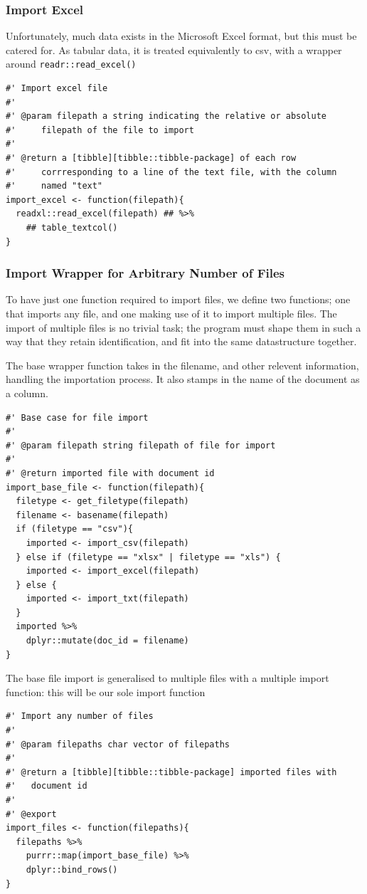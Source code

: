 \documentclass[11pt, a4paper, oneside]{report}
\begin{document}
\subsubsection{Import Excel}
\label{sec:org7535b78}
Unfortunately, much data exists in the Microsoft Excel format, but
this must be catered for. As tabular data, it is treated equivalently
to csv, with a wrapper around \texttt{readr::read_excel()}
\begin{verbatim}
#' Import excel file
#'
#' @param filepath a string indicating the relative or absolute
#'     filepath of the file to import
#'
#' @return a [tibble][tibble::tibble-package] of each row
#'     corrresponding to a line of the text file, with the column
#'     named "text"
import_excel <- function(filepath){
  readxl::read_excel(filepath) ## %>%
    ## table_textcol()
}
\end{verbatim}
\subsubsection{Import Wrapper for Arbitrary Number of Files}
\label{sec:orgf966fad}
To have just one function required to import files, we define two
functions; one that imports any file, and one making use of it to
import multiple files. The import of multiple files is no trivial
task; the program must shape them in such a way that they retain
identification, and fit into the same datastructure together.

The base wrapper function takes in the filename, and other relevent
information, handling the importation process. It also stamps in the
name of the document as a column.
\begin{verbatim}
#' Base case for file import
#'
#' @param filepath string filepath of file for import
#'
#' @return imported file with document id
import_base_file <- function(filepath){
  filetype <- get_filetype(filepath)
  filename <- basename(filepath)
  if (filetype == "csv"){
    imported <- import_csv(filepath)
  } else if (filetype == "xlsx" | filetype == "xls") {
    imported <- import_excel(filepath)
  } else {
    imported <- import_txt(filepath)
  }
  imported %>%
    dplyr::mutate(doc_id = filename)
}
\end{verbatim}
The base file import is generalised to multiple files with a multiple
import function: this will be our sole import function
\begin{verbatim}
#' Import any number of files
#'
#' @param filepaths char vector of filepaths
#'
#' @return a [tibble][tibble::tibble-package] imported files with
#'   document id
#' 
#' @export
import_files <- function(filepaths){
  filepaths %>%
    purrr::map(import_base_file) %>%
    dplyr::bind_rows()
}
\end{verbatim}
\end{document}
